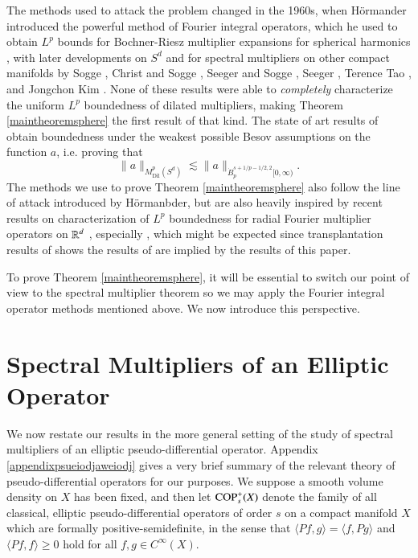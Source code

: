 The methods used to attack the problem changed in the 1960s, when H\"{o}rmander introduced the powerful method of Fourier integral operators, which he used to obtain $L^p$ bounds for Bochner-Riesz multiplier expansions for spherical harmonics \cite{HormanderRiesz}, with later developments on $S^d$ and for spectral multipliers on other compact manifolds by Sogge \cite{SoggeSpectralClusters,SoggeRieszMeans,SoggeSphericalHarmonics}, Christ and Sogge \cite{ChristandSogge}, Seeger and Sogge \cite{SeegerSoggeBochnerRiesz}, Seeger \cite{SeegerEndpointEstimatesMultipliers}, Terence Tao \cite{Tao}, and Jongchon Kim \cite{KimSpectral}. None of these results were able to \emph{completely} characterize the uniform $L^p$ boundedness of dilated multipliers, making Theorem \ref{maintheoremsphere} the first result of that kind. The state of art results of \cite{KimSpectral} obtain boundedness under the weakest possible Besov assumptions on the function $a$, i.e. proving that
%
\begin{equation}
  \| a \|_{M^p_{\text{Dil}}(S^d)} \lesssim \| a \|_{\dot{B}^{s+1/p - 1/2,2}_p[0,\infty)}.
\end{equation}
%
The methods we use to prove Theorem \ref{maintheoremsphere} also follow the line of attack introduced by H\"{o}rmanbder, but are also heavily inspired by recent results on characterization of $L^p$ boundedness for radial Fourier multiplier operators on $\operatorname{\mathbb{R}}^d$ \cite{Cladek,GarrigosandSeeger,HeoandNazarovandSeeger,KimQuasiradial}, especially \cite{HeoandNazarovandSeeger}, which might be expected since transplantation results of \cite{Mitjagin} shows the results of \cite{HeoandNazarovandSeeger} are implied by the results of this paper.

To prove Theorem \ref{maintheoremsphere}, it will be essential to switch our point of view to the spectral multiplier theorem so we may apply the Fourier integral operator methods mentioned above. We now introduce this perspective.

\section{Spectral Multipliers of an Elliptic Operator}

We now restate our results in the more general setting of the study of spectral multipliers of an elliptic pseudo-differential operator. Appendix \ref{appendixpsueiodjaweiodj} gives a very brief summary of the relevant theory of pseudo-differential operators for our purposes. We suppose a smooth volume density on $X$ has been fixed, and then let ${\text{COP}^{+}_{{s}}}(X)$ denote the family of all classical, elliptic pseudo-differential operators of order $s$ on a compact manifold $X$ which are formally positive-semidefinite, in the sense that $\langle Pf, g \rangle = \langle f, Pg \rangle$ and $\langle Pf, f \rangle \geq 0$ hold for all $f,g \in C^\infty(X)$.


